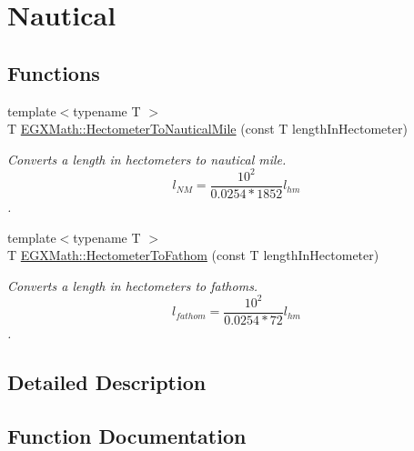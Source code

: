 \hypertarget{group___e_g_x_math-_conversions-_length_conversions-_s_i-_hectometer-_nautical}{}\section{Nautical}
\label{group___e_g_x_math-_conversions-_length_conversions-_s_i-_hectometer-_nautical}
\subsection*{Functions}
\begin{DoxyCompactItemize}
\item 
{\footnotesize template$<$typename T $>$ }\\T \mbox{\hyperlink{group___e_g_x_math-_conversions-_length_conversions-_s_i-_hectometer-_nautical_ga74e84be72b4e2272d547b5d7e21211dc}{E\+G\+X\+Math\+::\+Hectometer\+To\+Nautical\+Mile}} (const T length\+In\+Hectometer)
\begin{DoxyCompactList}\small\item\em Converts a length in hectometers to nautical mile. \[ l_{NM}= \frac{10^{2}}{0.0254 * 1852} l_{hm} \]. \end{DoxyCompactList}\item 
{\footnotesize template$<$typename T $>$ }\\T \mbox{\hyperlink{group___e_g_x_math-_conversions-_length_conversions-_s_i-_hectometer-_nautical_ga487d637d16d2468a9969ab3a4f50eeb1}{E\+G\+X\+Math\+::\+Hectometer\+To\+Fathom}} (const T length\+In\+Hectometer)
\begin{DoxyCompactList}\small\item\em Converts a length in hectometers to fathoms. \[ l_{fathom}= \frac{10^{2}}{0.0254 * 72} l_{hm} \]. \end{DoxyCompactList}\end{DoxyCompactItemize}


\subsection{Detailed Description}


\subsection{Function Documentation}
\mbox{\label{group___e_g_x_math-_conversions-_length_conversions-_s_i-_hectometer-_nautical_ga487d637d16d2468a9969ab3a4f50eeb1}} 
